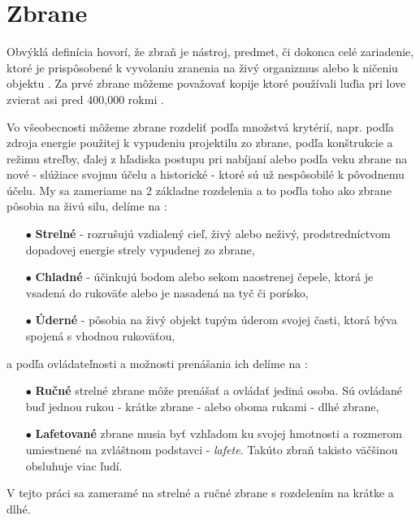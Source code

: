 
\section{Zbrane}

Obvýklá definícia hovorí, že zbraň je nástroj, predmet, či dokonca celé zariadenie,
ktoré je prispôsobené k vyvolaniu zranenia na živý organizmus alebo k ničeniu objektu \cite{book:StrelneZbrane}.
Za prvé zbrane môžeme považovať kopije ktoré používali luďia pri love zvierat asi pred 400,000 rokmi \cite{prop:SpearHistory}.

Vo všeobecnosti môžeme zbrane rozdeliť podľa množstvá krytérií, napr. podľa zdroja energie použitej k vypudeniu projektilu zo zbrane,
podľa konštrukcie a režimu streľby, ďalej z hľadiska postupu pri nabíjaní alebo podľa veku zbrane na nové - slúžiace svojmu účelu a historické - ktoré sú už nespôsobilé k pôvodnemu účelu.
My sa zameriame na 2 základne rozdelenia a to poďla toho ako zbrane pôsobia na živú silu, delíme na \cite{book:StrelneZbrane}:
\begin{enumerate}
	\item[$\bullet$] \textbf{Strelné} - rozrušujú vzdialený cieľ, živý alebo neživý, prodstredníctvom dopadovej energie strely vypudenej zo zbrane,
	\item[$\bullet$] \textbf{Chladné} - účinkujú bodom alebo sekom naostrenej čepele, ktorá je vsadená do rukoväťe alebo je nasadená na tyč či porísko,
    \item[$\bullet$] \textbf{Úderné} - pôsobia na živý objekt tupým úderom svojej časti, ktorá býva spojená s vhodnou rukoväťou,
\end{enumerate}
a podľa ovládateľnosti a možnosti prenášania ich delíme na \cite{book:StrelneZbrane}:
\begin{enumerate}
	\item[$\bullet$] \textbf{Ručné} strelné zbrane môže prenášať a ovládať jediná osoba. Sú ovládané buď jednou rukou - krátke zbrane - alebo oboma rukami - dlhé zbrane,
	\item[$\bullet$] \textbf{Lafetované} zbrane musia byť vzhľadom ku svojej hmotnosti a rozmerom umiestnené na zvláštnom podstavci - \textit{lafete}. Takúto zbraň takisto väčšinou obsluhuje viac ľudí.
\end{enumerate}
V tejto práci sa zameramé na strelné a ručné zbrane s rozdelením na krátke a dlhé.
